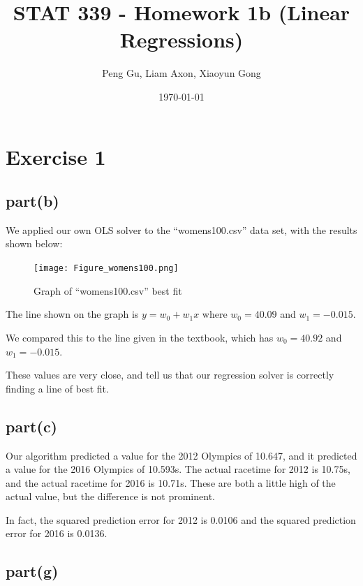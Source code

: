 \documentclass[12pt]{amsart}
\begin{document}
\title[STAT339 - Machine Learning]{STAT 339 - Homework 1b (Linear Regressions)}

\author{Peng Gu, Liam Axon, Xiaoyun Gong} 
\date{\today}

\maketitle

\section*{Exercise 1}

\subsection*{part(b)}

We applied our own OLS solver to the ``womens100.csv'' data set, with the results shown below:

\begin{figure}[H]
    \centering
    \texttt{[image: Figure\_womens100.png]}
    \caption{Graph of ``womens100.csv'' best fit}
    \label{fig:my_label}
\end{figure}

The line shown on the graph is $y = w_0 + w_1 x$ where $w_0 = 40.09$ and $w_1 = -0.015$.

We compared this to the line given in the textbook, which has $w_0 = 40.92$ and $w_1 = -0.015$.

These values are very close, and tell us that our regression solver is correctly finding a line of best fit.

\subsection*{part(c)}

Our algorithm predicted a value for the 2012 Olympics of 10.647, and it predicted a value for the 2016 Olympics of 10.593s. The actual racetime for 2012 is 10.75s, and the actual racetime for 2016 is 10.71s. These are both a little high of the actual value, but the difference is not prominent.

In fact, the squared prediction error for 2012 is 0.0106 and the squared prediction error for 2016 is 0.0136.

\subsection*{part(g)}
\end{document}

